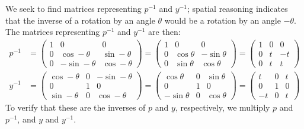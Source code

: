 \documentclass{article}
\begin{document}
We seek to find matrices representing $p^{-1}$ and $y^{-1}$; spatial reasoning indicates that the inverse of a rotation by an angle $\theta$ would be a rotation by an angle $-\theta$. The matrices representing $p^{-1}$ and $y^{-1}$ are then:
\begin{equation}
    \begin{split}
        p^{-1} & = \begin{pmatrix} 
            1 & 0 & 0 \\
            0 & \cos -\theta & \sin -\theta  \\
            0 & -\sin -\theta & \cos -\theta
        \end{pmatrix}  = \begin{pmatrix} 
            1 & 0 & 0 \\
            0 & \cos \theta & -\sin \theta  \\
            0 & \sin \theta & \cos \theta
        \end{pmatrix}  = \begin{pmatrix} 
            1 & 0 & 0 \\
            0 & t & -t  \\
            0 & t & t
        \end{pmatrix} \\
        y^{-1} & = 
        \begin{pmatrix} 
            \cos -\theta  & 0 & -\sin -\theta \\
            0 & 1 &  0 \\
            \sin -\theta & 0 & \cos -\theta
        \end{pmatrix} = 
        \begin{pmatrix} 
            \cos \theta  & 0 & \sin \theta \\
            0 & 1 &  0 \\
            -\sin \theta & 0 & \cos \theta
        \end{pmatrix} = 
        \begin{pmatrix} 
            t  & 0 & t \\
            0 & 1 &  0 \\
            -t & 0 & t
        \end{pmatrix}
    \end{split}
\end{equation}
To verify that these are the inverses of $p$ and $y$, respectively, we multiply $p$ and $p^{-1}$, and $y$ and $y^{-1}$.
\end{document}
